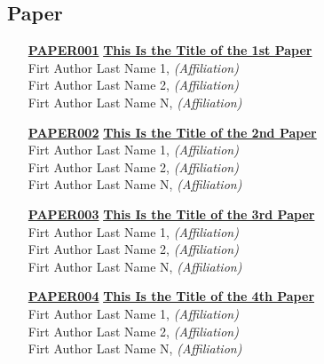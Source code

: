 
\subsection{Paper}
\begin{enumerate}
\item[\href{https://doi.org/10.1145/1122445.1122456}{\textbf{PAPER001}}]
\href{https://doi.org/10.1145/1122445.1122456}{\textbf{This Is the Title of the 1st Paper}}\\
Firt Author Last Name 1, \emph{(Affiliation)}\\
Firt Author Last Name 2, \emph{(Affiliation)}\\
Firt Author Last Name N, \emph{(Affiliation)}\\

\item[\href{https://doi.org/10.1145/1122445.1122456}{\textbf{PAPER002}}]
\href{https://doi.org/10.1145/1122445.1122456}{\textbf{This Is the Title of the 2nd Paper}}\\
Firt Author Last Name 1, \emph{(Affiliation)}\\
Firt Author Last Name 2, \emph{(Affiliation)}\\
Firt Author Last Name N, \emph{(Affiliation)}\\

\item[\href{https://doi.org/10.1145/1122445.1122456}{\textbf{PAPER003}}]
\href{https://doi.org/10.1145/1122445.1122456}{\textbf{This Is the Title of the 3rd Paper}}\\
Firt Author Last Name 1, \emph{(Affiliation)}\\
Firt Author Last Name 2, \emph{(Affiliation)}\\
Firt Author Last Name N, \emph{(Affiliation)}\\

\item[\href{https://doi.org/10.1145/1122445.1122456}{\textbf{PAPER004}}]
\href{https://doi.org/10.1145/1122445.1122456}{\textbf{This Is the Title of the 4th Paper}}\\
Firt Author Last Name 1, \emph{(Affiliation)}\\
Firt Author Last Name 2, \emph{(Affiliation)}\\
Firt Author Last Name N, \emph{(Affiliation)}\\
\end{enumerate}


